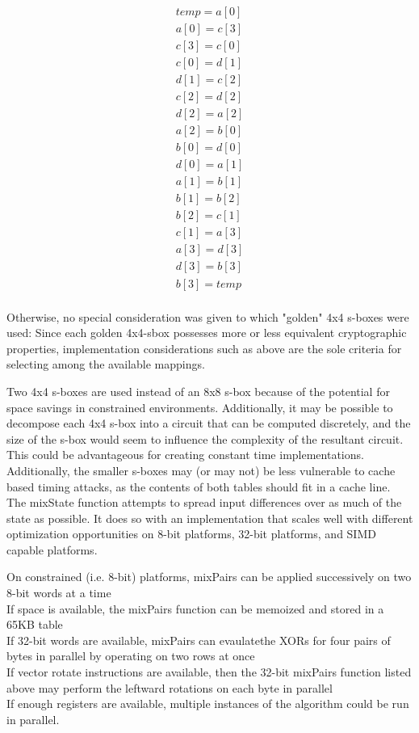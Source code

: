 \documentclass[preprint]{iacrtrans}
\begin{document}
\begin{align}
    temp = a[0]\\
    a[0] = c[3]\\
    c[3] = c[0]\\
    c[0] = d[1]\\
    d[1] = c[2]\\
    c[2] = d[2]\\
    d[2] = a[2]\\
    a[2] = b[0]\\
    b[0] = d[0]\\
    d[0] = a[1]\\
    a[1] = b[1]\\
    b[1] = b[2]\\
    b[2] = c[1]\\
    c[1] = a[3]\\
    a[3] = d[3]\\
    d[3] = b[3]\\
    b[3] = temp\\
\end{align}

Otherwise, no special consideration was given to which "golden" 4x4 s-boxes were used: Since each golden 4x4-sbox possesses more or less equivalent cryptographic properties, implementation considerations such as above are the sole criteria for selecting among the available mappings. 

Two 4x4 s-boxes are used instead of an 8x8 s-box because of the potential for space savings in constrained environments. Additionally, it may be possible to decompose each 4x4 s-box into a circuit that can be computed discretely, and the size of the s-box would seem to influence the complexity of the resultant circuit. This could be advantageous for creating constant time implementations. Additionally, the smaller s-boxes may (or may not) be less vulnerable to cache based timing attacks, as the contents of both tables should fit in a cache line. \\

The mixState function attempts to spread input differences over as much of the state as possible. It does so with an implementation that scales well with different optimization opportunities on 8-bit platforms, 32-bit platforms, and SIMD capable platforms.

On constrained (i.e. 8-bit) platforms, mixPairs can be applied successively on two 8-bit words at a time\\
If space is available, the mixPairs function can be memoized and stored in a 65KB table\\
If 32-bit words are available, mixPairs can evaulatethe XORs for four pairs of bytes in parallel by operating on two rows at once\\
If vector rotate instructions are available, then the 32-bit mixPairs function listed above may perform the leftward rotations on each byte in parallel\\
If enough registers are available, multiple instances of the algorithm could be run in parallel.\\
\end{document}
